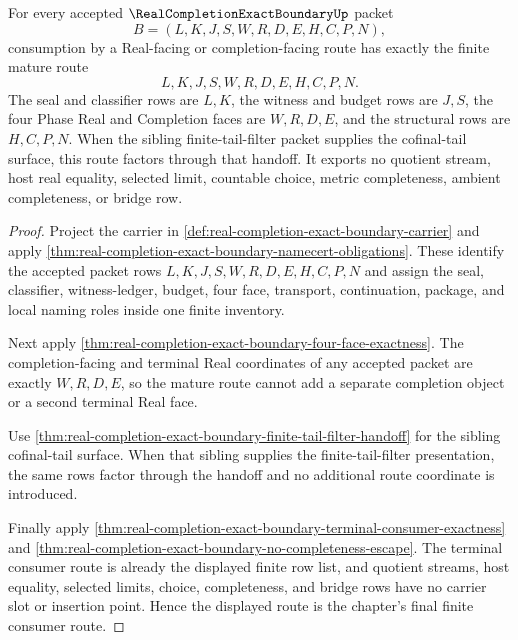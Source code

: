 \begin{theorem}
\label{thm:real-completion-exact-boundary-mature-route}
For every accepted $\RealCompletionExactBoundaryUp$ packet
$$
B=(L,K,J,S,W,R,D,E,H,C,P,N),
$$
consumption by a Real-facing or completion-facing route has exactly the finite mature route
$$
L,K,J,S,W,R,D,E,H,C,P,N.
$$
The seal and classifier rows are $L,K$, the witness and budget rows are $J,S$, the four Phase Real and Completion faces are $W,R,D,E$, and the structural rows are $H,C,P,N$. When the sibling finite-tail-filter packet supplies the cofinal-tail surface, this route factors through that handoff. It exports no quotient stream, host real equality, selected limit, countable choice, metric completeness, ambient completeness, or bridge row.
\end{theorem}
\begin{proof}
Project the carrier in \autoref{def:real-completion-exact-boundary-carrier} and apply \autoref{thm:real-completion-exact-boundary-namecert-obligations}. These identify the accepted packet rows $L,K,J,S,W,R,D,E,H,C,P,N$ and assign the seal, classifier, witness-ledger, budget, four face, transport, continuation, package, and local naming roles inside one finite inventory.

Next apply \autoref{thm:real-completion-exact-boundary-four-face-exactness}. The completion-facing and terminal Real coordinates of any accepted packet are exactly $W,R,D,E$, so the mature route cannot add a separate completion object or a second terminal Real face.

Use \autoref{thm:real-completion-exact-boundary-finite-tail-filter-handoff} for the sibling cofinal-tail surface. When that sibling supplies the finite-tail-filter presentation, the same rows factor through the handoff and no additional route coordinate is introduced.

Finally apply \autoref{thm:real-completion-exact-boundary-terminal-consumer-exactness} and \autoref{thm:real-completion-exact-boundary-no-completeness-escape}. The terminal consumer route is already the displayed finite row list, and quotient streams, host equality, selected limits, choice, completeness, and bridge rows have no carrier slot or insertion point. Hence the displayed route is the chapter's final finite consumer route.
\end{proof}

